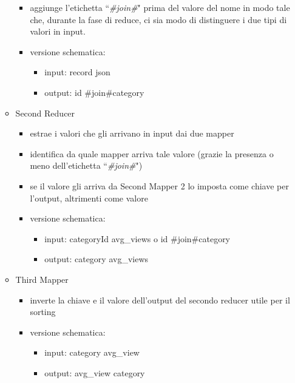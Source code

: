\documentclass[10pt]{article}
\begin{document}
\begin{itemize}
\begin{itemize}
\begin{itemize}
                    \item aggiunge l'etichetta ``\textit{\#join\#}" prima del valore del nome in modo tale che, durante la fase di reduce, ci sia modo di distinguere i due tipi di valori in input.
                    \item versione schematica:
                    \begin{itemize}
                        \item input: record json
                        \item output: id \textrightarrow \#join\#category
                    \end{itemize}
                \end{itemize}
            \item Second Reducer
                \begin{itemize}
                    \item estrae i valori che gli arrivano in input dai due mapper
                    \item identifica da quale mapper arriva tale valore (grazie la presenza o meno dell'etichetta ``\textit{\#join\#}")
                    \item se il valore gli arriva da Second Mapper 2 lo imposta come chiave per l'output, altrimenti come valore
                    \item versione schematica:
                    \begin{itemize}
                        \item input: categoryId \textrightarrow avg\_views o id \textrightarrow \#join\#category
                        \item output: category \textrightarrow avg\_views
                    \end{itemize}
                \end{itemize}
            \item Third Mapper
                \begin{itemize}
                    \item inverte la chiave e il valore dell'output del secondo reducer utile per il sorting
                    \item versione schematica:
                    \begin{itemize}
                        \item input: category \textrightarrow avg\_view
                        \item output: avg\_view \textrightarrow category

\end{itemize}
\end{itemize}
\end{itemize}
\end{itemize}
\end{document}
